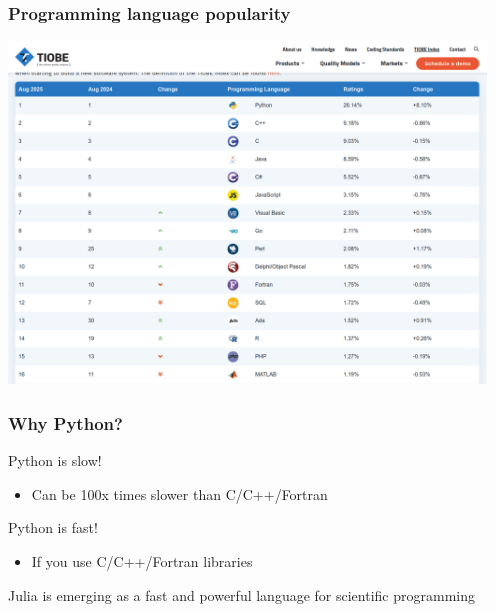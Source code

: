 \documentclass{beamer}
\begin{document}
\begin{frame}[fragile]
  \frametitle{Programming language popularity}
  \begin{center}
  \includegraphics[width=0.95\textwidth]{TIOBE-2025.png}
  \end{center}
\end{frame}

\begin{frame}[fragile]
  \frametitle{Why Python?}
  \begin{block}{Python is slow!}
  \begin{itemize}
  \item Can be 100x times slower than C/C++/Fortran
  \end{itemize}
  \end{block}\pause
  \begin{block}{Python is fast!}
  \begin{itemize}
  \item If you use C/C++/Fortran libraries
  \end{itemize}
  \end{block}\pause
  \begin{alertblock}{}
  \centering Julia is emerging as a fast and powerful language for scientific programming
  \end{alertblock}
\end{frame}


\end{document}
